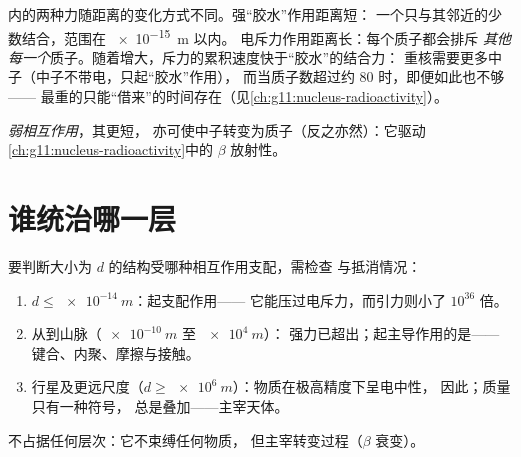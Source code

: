 \begin{remark}\label{rem:g11:fundamental-interactions:nuclei}
内的两种力随距离的变化方式不同。强“胶水”作用距离短：
一个只与其邻近的少数结合，范围在 \qty{e-15}{m} 以内。
电斥力作用距离长：每个质子都会排斥
\emph{其他每一个}质子。随着增大，斥力的累积速度快于“胶水”的结合力：
重核需要更多中子（中子不带电，只起“胶水”作用），
而当质子数超过约 $80$ 时，即便如此也不够——
最重的只能“借来”的时间存在（见\cref{ch:g11:nucleus-radioactivity}）。
\end{remark}

\begin{definition}[弱相互作用]\label{def:g11:fundamental-interactions:weak}
\emph{弱相互作用}，其更短，
亦可使中子转变为质子（反之亦然）：它驱动
\cref{ch:g11:nucleus-radioactivity}中的 $\beta$ 放射性。
\end{definition}

\section{谁统治哪一层}

\begin{method}[判断尺度]\label{met:g11:fundamental-interactions:audit}
要判断大小为 $d$ 的结构受哪种相互作用支配，需检查
与抵消情况：
\begin{enumerate}
  \item $d \leq \qty{e-14}{m}$：\emph{}起支配作用——
        它能压过电斥力，而引力则小了 $10^{36}$ 倍。
  \item 从到山脉（$\qty{e-10}{m}$ 至 $\qty{e4}{m}$）：
        强力已超出；起主导作用的是\emph{}——键合、内聚、摩擦与接触。
  \item 行星及更远尺度（$d \geq \qty{e6}{m}$）：物质在极高精度下呈电中性，
        因此；质量只有一种符号，
        总是叠加——\emph{}主宰天体。
\end{enumerate}
不占据任何层次：它不束缚任何物质，
但主宰转变过程（$\beta$ 衰变）。
\end{method}


